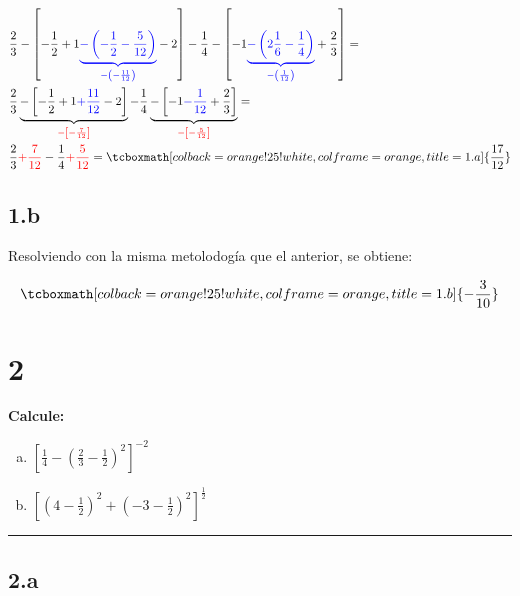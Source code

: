 \documentclass{article}
\newcommand{\hresult}[2]{\tcboxmath[colback=orange!25!white,colframe=orange, title=#1] {#2} }
\begin{document}
\begin{subequations}
\begin{align}
&\frac{2}{3} - \left[ -\frac{1}{2} + 1 \textcolor{blue}{ \underbrace{ - \left( -\frac{1}{2} - \frac{5}{12} \right)}_{-\left(    -\frac{11}{12} \right)}} - 2  \right] -\frac{1}{4} - \left[ -1 \textcolor{blue}{ \underbrace{ -\left(2 \frac{1}{6} - \frac{1}{4} \right) }_{-\left( \frac{1}{12} \right)}} +\frac{2}{3} \right] = \\
&\frac{2}{3} \underbrace{ - \left[ -\frac{1}{2} + 1 \textcolor{blue}{ + \frac{11}{12} } - 2  \right] }_{\textcolor{red}{-\left[ -\frac{7}{12} \right]}} -\frac{1}{4} \underbrace{-\left[ -1 \textcolor{blue}{ -\frac{1}{12} } +\frac{2}{3} \right]}_{\textcolor{red}{-\left[ -\frac{5}{12} \right]}} = \\ 
&\frac{2}{3} \textcolor{red}{ +\frac{7}{12} } -\frac{1}{4} \textcolor{red}{ +\frac{5}{12} } = \hresult{1.a} { \frac{17}{12} }
\end{align}
\end{subequations}

\subsection*{1.b}
\label{subsec:1.b}

Resolviendo con la misma metolodogía que el anterior, se obtiene:

\begin{equation}
\hresult{1.b} { -\frac{3}{10} }
\end{equation}

\section*{2}
\label{sec:2}

\textbf{Calcule:}

\begin{enumerate}[(a)]
\bfseries

\item $\left[ \frac{1}{4} - \left( \frac{2}{3} - \frac{1}{2} \right)^2 \right]^{-2}$

\item $\left[ \left( 4 - \frac{1}{2} \right)^2 + \left( -3-\frac{1}{2} \right)^2 \right]^{\frac{1}{2}}$

\end{enumerate}
\hrule

\subsection*{2.a}
\label{subsec:2.a}
\end{document}
